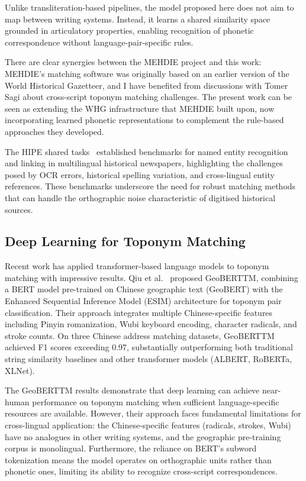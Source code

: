 \documentclass[11pt]{article}
\begin{document}
    Unlike transliteration-based pipelines, the model proposed here does not aim to map between writing systems. Instead, it learns a shared similarity space grounded in articulatory properties, enabling recognition of phonetic correspondence without language-pair-specific rules.

    There are clear synergies between the MEHDIE project and this work: MEHDIE's matching software was originally based on an earlier version of the World Historical Gazetteer, and I have benefited from discussions with Tomer Sagi about cross-script toponym matching challenges. The present work can be seen as extending the WHG infrastructure that MEHDIE built upon, now incorporating learned phonetic representations to complement the rule-based approaches they developed.

    The HIPE shared tasks~\citep{ehrmann2020,ehrmann2022} established benchmarks for named entity recognition and linking in multilingual historical newspapers, highlighting the challenges posed by OCR errors, historical spelling variation, and cross-lingual entity references. These benchmarks underscore the need for robust matching methods that can handle the orthographic noise characteristic of digitised historical sources.

    \subsection{Deep Learning for Toponym Matching}

    Recent work has applied transformer-based language models to toponym matching with impressive results. Qiu et al.~\citep{qiu2024geobert} proposed GeoBERTTM, combining a BERT model pre-trained on Chinese geographic text (GeoBERT) with the Enhanced Sequential Inference Model (ESIM) architecture for toponym pair classification. Their approach integrates multiple Chinese-specific features including Pinyin romanization, Wubi keyboard encoding, character radicals, and stroke counts. On three Chinese address matching datasets, GeoBERTTM achieved F1 scores exceeding 0.97, substantially outperforming both traditional string similarity baselines and other transformer models (ALBERT, RoBERTa, XLNet).

    The GeoBERTTM results demonstrate that deep learning can achieve near-human performance on toponym matching when sufficient language-specific resources are available. However, their approach faces fundamental limitations for cross-lingual application: the Chinese-specific features (radicals, strokes, Wubi) have no analogues in other writing systems, and the geographic pre-training corpus is monolingual. Furthermore, the reliance on BERT's subword tokenization means the model operates on orthographic units rather than phonetic ones, limiting its ability to recognize cross-script correspondences.
\end{document}
